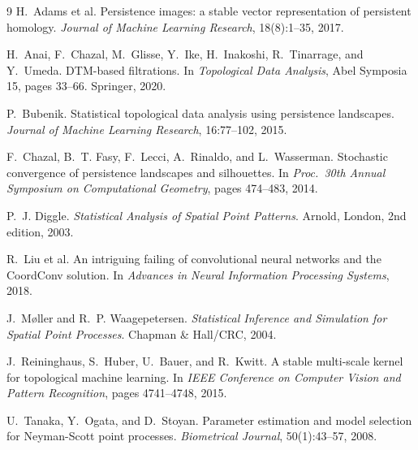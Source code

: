 \documentclass[11pt,a4paper]{article}
\theoremstyle{definitioncolon}
\begin{document}
{\footnotesize
\setlength{\bibsep}{1pt plus 0.3ex}
\begin{thebibliography}{9}
\setlength{\itemsep}{0pt}
\setlength{\parskip}{0pt}
H.~Adams et al.
\newblock Persistence images: a stable vector representation of persistent
homology.
\newblock \emph{Journal of Machine Learning Research}, 18(8):1--35, 2017.

H.~Anai, F.~Chazal, M.~Glisse, Y.~Ike, H.~Inakoshi, R.~Tinarrage, and
Y.~Umeda.
\newblock DTM-based filtrations.
\newblock In \emph{Topological Data Analysis}, Abel Symposia 15, pages 33--66.
Springer, 2020.

P.~Bubenik.
\newblock Statistical topological data analysis using persistence landscapes.
\newblock \emph{Journal of Machine Learning Research}, 16:77--102, 2015.

F.~Chazal, B.~T. Fasy, F.~Lecci, A.~Rinaldo, and L.~Wasserman.
\newblock Stochastic convergence of persistence landscapes and silhouettes.
\newblock In \emph{Proc.\ 30th Annual Symposium on Computational Geometry},
pages 474--483, 2014.

P.~J. Diggle.
\newblock \emph{Statistical Analysis of Spatial Point Patterns}.
\newblock Arnold, London, 2nd edition, 2003.

R.~Liu et al.
\newblock An intriguing failing of convolutional neural networks and the
CoordConv solution.
\newblock In \emph{Advances in Neural Information Processing Systems}, 2018.

J.~M\o ller and R.~P. Waagepetersen.
\newblock \emph{Statistical Inference and Simulation for Spatial Point
Processes}.
\newblock Chapman \& Hall/CRC, 2004.

J.~Reininghaus, S.~Huber, U.~Bauer, and R.~Kwitt.
\newblock A stable multi-scale kernel for topological machine learning.
\newblock In \emph{IEEE Conference on Computer Vision and Pattern Recognition},
pages 4741--4748, 2015.

U.~Tanaka, Y.~Ogata, and D.~Stoyan.
\newblock Parameter estimation and model selection for Neyman-Scott point
processes.
\newblock \emph{Biometrical Journal}, 50(1):43--57, 2008.


\end{thebibliography}}
\end{document}
